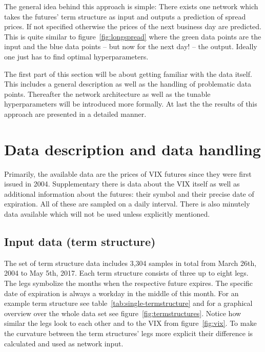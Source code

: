 The general idea behind this approach is simple: There exists one network which takes the futures' term structure as input and outputs a prediction of spread prices. If not specified otherwise the prices of the next business day are predicted. This is quite similar to figure~\ref{fig:longspread} where the green data points are the input and the blue data points -- but now for the next day! -- the output. Ideally one just has to find optimal hyperparameters.

The first part of this section will be about getting familiar with the data itself. This includes a general description as well as the handling of problematic data points.
Thereafter the network architecture as well as the tunable hyperparameters will be introduced more formally.
At last the the results of this approach are presented in a detailed manner.

\section{Data description and data handling}
\label{sec:aao-data-handling}

Primarily, the available data are the prices of VIX futures since they were first issued in 2004. Supplementary there is data about the VIX itself as well as additional information about the futures: their symbol and their precise date of expiration. All of these are sampled on a daily interval. There is also minutely data available which will not be used unless explicitly mentioned.

\subsection{Input data (term structure)}
\label{sec:aao-input-data}

The set of term structure data includes 3,304 samples in total from March 26th, 2004 to May 5th, 2017. Each term structure consists of three up to eight legs. The legs symbolize the months when the respective future expires. The specific date of expiration is always a workday in the middle of this month. For an example term structure see table~\ref{tab:single-termstructure} and for a graphical overview over the whole data set see figure~\ref{fig:termstructures}. Notice how similar the legs look to each other and to the VIX from figure~\ref{fig:vix}. To make the curvature between the term structures' legs more explicit their difference is calculated and used as network input.

